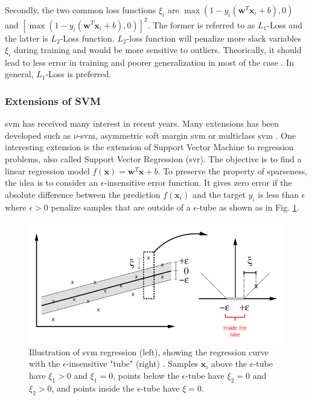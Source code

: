 Secondly, the two common loss functions $\xi_i$ are $\max(1-y_i (\textbf{w}^T \textbf{x}_i+b), 0)$ and $[\max(1-y_i(\textbf{w}^T \textbf{x}_i+b), 0)]^2$. The former is referred to as $L_1$-Loss and the latter is $L_2$-Loss function. $L_2$-loss function will penalize more slack variables $\xi_i$ during training and would be more sensitive to outliers. Theorically, it should lead to less error in training and poorer generalization in most of the case \cite{Hsu2008}. In general, $L_1$-Loss is preferred.



\subsubsection{Extensions of SVM}
{\sc svm} has received many interest in recent years. Many extensions has been developed such as $\nu$-{\sc svm}, asymmetric soft margin {\sc svm} or multiclass {\sc svm} \cite{Kijsirikul2002,Crammer2001}. One interesting extension is the extension of Support Vector Machine to regression problems, also called Support Vector Regression ({\sc svr}). The objective is to find a linear regression model $f(\textbf{x})=\textbf{w}^T\textbf{x}+b$. To preserve the property of sparseness, the idea is to consider an $\epsilon$-insensitive error function. It gives zero error if the absolute difference between
the prediction $f(\textbf{x}_i)$ and the target $y_i$ is less than $\epsilon$ where $\epsilon > 0$ penalize samples that are outside of a $\epsilon$-tube as shown as in Fig. \ref{fig:SVR_tube}.

\begin{figure}[h!]
\centering
\includegraphics[width=0.8\linewidth]{images/SVR_tube}
\caption[Illustration of {\sc svm} regression (left), showing the regression curve with the $\epsilon$-insensitive "tube" (right).]{Illustration of {\sc svm} regression (left), showing the regression curve with the $\epsilon$-insensitive "tube" (right) \cite{Clarke2005}. Samples $\textbf{x}_i$ above the $\epsilon$-tube have $\xi_1 > 0$ and $\xi_1 = 0$, points below the $\epsilon$-tube have $\xi_2 = 0$ and $\xi_2 > 0$, and points inside the $\epsilon$-tube have $\xi = 0$. }
\label{fig:SVR_tube}
\end{figure}

